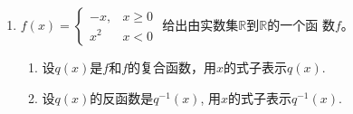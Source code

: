 \begin{enumerate}
\item $f(x)=\begin{cases}
    -x,& x\ge 0\\ x^2& x<0
\end{cases}$
给出由实数集$\mathbb{R}$到$\mathbb{R}$的一个函
数$f$。
\begin{enumerate}
    \item 设$q(x)$是$f$和$f$的复合函数，用$x$的式子表示$q(x)$.
    \item 设$q(x)$的反函数是$q^{-1}(x)$, 用$x$的式子表示$q^{-1}(x)$.
\end{enumerate}
\end{enumerate}






